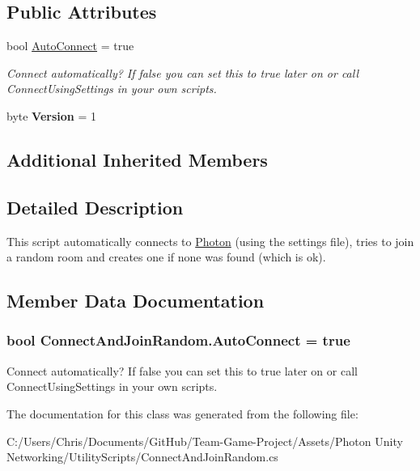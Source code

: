 \subsection*{Public Attributes}
\begin{DoxyCompactItemize}
\item 
bool \hyperlink{class_connect_and_join_random_ad1bdc6e43fba410f858cf53c003356a6}{Auto\+Connect} = true
\begin{DoxyCompactList}\small\item\em Connect automatically? If false you can set this to true later on or call Connect\+Using\+Settings in your own scripts.\end{DoxyCompactList}\item 
byte {\bfseries Version} = 1\hypertarget{class_connect_and_join_random_a3cfdc20e538daf4b47e15c90a8fd677b}{}\label{class_connect_and_join_random_a3cfdc20e538daf4b47e15c90a8fd677b}

\end{DoxyCompactItemize}
\subsection*{Additional Inherited Members}


\subsection{Detailed Description}
This script automatically connects to \hyperlink{namespace_photon}{Photon} (using the settings file), tries to join a random room and creates one if none was found (which is ok). 



\subsection{Member Data Documentation}
\subsubsection[{\texorpdfstring{Auto\+Connect}{AutoConnect}}]{\setlength{\rightskip}{0pt plus 5cm}bool Connect\+And\+Join\+Random.\+Auto\+Connect = true}\hypertarget{class_connect_and_join_random_ad1bdc6e43fba410f858cf53c003356a6}{}\label{class_connect_and_join_random_ad1bdc6e43fba410f858cf53c003356a6}


Connect automatically? If false you can set this to true later on or call Connect\+Using\+Settings in your own scripts.



The documentation for this class was generated from the following file\+:\begin{DoxyCompactItemize}
\item 
C\+:/\+Users/\+Chris/\+Documents/\+Git\+Hub/\+Team-\/\+Game-\/\+Project/\+Assets/\+Photon Unity Networking/\+Utility\+Scripts/Connect\+And\+Join\+Random.\+cs\end{DoxyCompactItemize}

